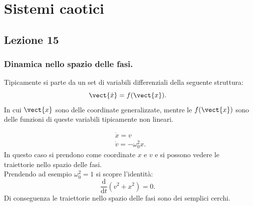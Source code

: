\setcounter{Sec}{\value{section}} %
\chapter{Sistemi caotici}
\setcounter{section}{\value{Sec}} %

\section{Lezione 15}%
\label{sub:Lezione 15}
\subsection{Dinamica nello spazio delle fasi.}%
\label{sub:Dinamica nello spazio delle fasi.}
Tipicamente si parte da un set di variabili differenziali della seguente struttura:
\[
    \vect{\dot{x}} = f(\vect{x}) 
.\] 
In cui $\vect{x}$  sono delle coordinate generalizzate, mentre le $f(\vect{x})$  sono delle funzioni di queste variabili tipicamente non lineari.
\begin{exmp}
    \[\begin{aligned}
	& \dot{x}=v\\
	& \dot{v} = -\omega_0^2x
    .\end{aligned}\]
    In questo caso si prendono come coordinate $x$  e $v$  e si possono vedere le traiettorie nello spazio delle fasi.\\
    Prendendo ad esempio $\omega_0^2 = 1$  si scopre l'identità:
    \[
	\frac{\text{d} }{\text{d} t} (v^2+x^2) = 0
    .\] 
    Di conseguenza le traiettorie nello spazio delle fasi sono dei semplici cerchi.
    
\end{exmp}
\noindent
